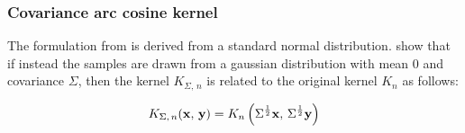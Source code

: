 \subsubsection{Covariance arc cosine kernel}

The formulation from \textcite{choLargemarginClassificationInfinite2010} is derived from a standard normal
distribution. \Textcite{pandeyGoDeepWide2014} show that if instead the samples are drawn from a gaussian
distribution with mean 0 and covariance $\Sigma$, then the kernel $K_{\Sigma,\,n}$ is related to the
original kernel $K_{n}$ as follows:

\begin{equation}\label{eq:kernel_pandey}
K_{\Sigma,\,n}(\mathbf{x},\,\mathbf{y}) = K_{n}\left(\Sigma^{\frac{1}{2}}\mathbf{x},\,\Sigma^{\frac{1}{2}}\mathbf{y}\right)
\end{equation}

